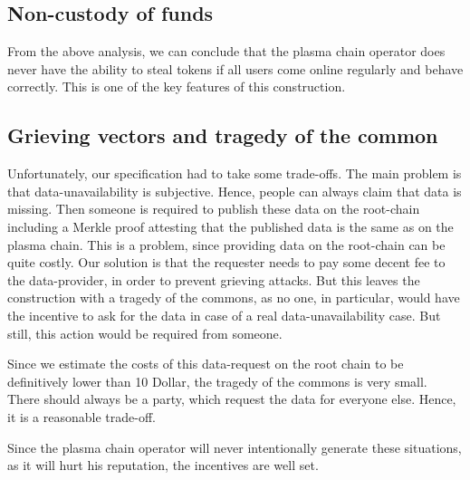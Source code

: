 \documentclass[11pt,parskip=full]{scrartcl}%
\begin{document}
\subsection{Non-custody of funds}
From the above analysis, we can conclude that the plasma chain operator does never have the ability to steal tokens if all users come online regularly and behave correctly. 
This is one of the key features of this construction. 

\subsection{Grieving vectors and tragedy of the common}
Unfortunately, our specification had to take some trade-offs. 
The main problem is that data-unavailability is subjective. 
Hence, people can always claim that data is missing. 
Then someone is required to publish these data on the root-chain including a Merkle proof attesting that the published data is the same as on the plasma chain. 
This is a problem, since providing data on the root-chain can be quite costly. 
Our solution is that the requester needs to pay some decent fee to the data-provider, in order to prevent grieving attacks. 
But this leaves the construction with a tragedy of the commons, as no one, in particular, would have the incentive to ask for the data in case of a real data-unavailability case. 
But still, this action would be required from someone. 

Since we estimate the costs of this data-request on the root chain to be definitively lower than 10 Dollar, the tragedy of the commons is very small. 
There should always be a party, which request the data for everyone else. Hence, it is a reasonable trade-off. 

Since the plasma chain operator will never intentionally generate these situations, as it will hurt his reputation, the incentives are well set. 
\end{document}
